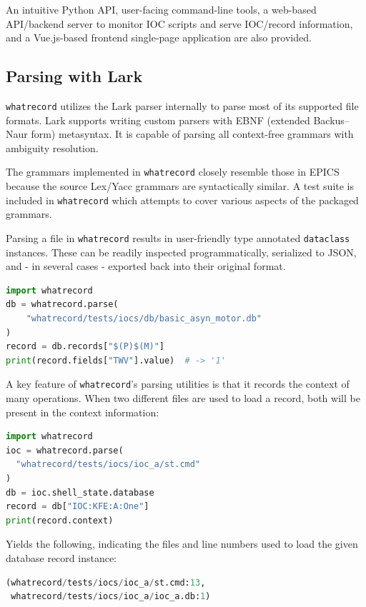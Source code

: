 \documentclass[letter,
               keeplastbox,   %
               ]{jacow}
\begin{document}
An intuitive Python API, user-facing command-line tools, a web-based
API/backend server to monitor IOC scripts and serve IOC/record information, and
a Vue.js-based frontend single-page application are also provided.

\subsection{Parsing with Lark}

\verb_whatrecord_ utilizes the Lark parser internally to parse most of its supported
file formats.  Lark supports writing custom parsers with EBNF (extended
Backus–Naur form) metasyntax.  It is capable of parsing all context-free
grammars with ambiguity resolution. 

The grammars implemented in \verb_whatrecord_ closely resemble those in EPICS because
the source Lex/Yacc grammars are syntactically similar.  A test suite is
included in \verb_whatrecord_ which attempts to cover various aspects of the packaged
grammars.

Parsing a file in \verb_whatrecord_ results in user-friendly type annotated
\verb_dataclass_ instances. These can be readily inspected programmatically,
serialized to JSON, and - in several cases - exported back into their original
format.

\begin{lstlisting}[language=python]
import whatrecord
db = whatrecord.parse(
    "whatrecord/tests/iocs/db/basic_asyn_motor.db"
)
record = db.records["$(P)$(M)"]
print(record.fields["TWV"].value)  # -> '1'
\end{lstlisting}

A key feature of \verb_whatrecord_'s parsing utilities is that it records the context
of many operations.  When two different files are used to load a record,
both will be present in the context information:

\begin{lstlisting}[language=python]
import whatrecord
ioc = whatrecord.parse(
  "whatrecord/tests/iocs/ioc_a/st.cmd"
)
db = ioc.shell_state.database
record = db["IOC:KFE:A:One"]
print(record.context)
\end{lstlisting}

Yields the following, indicating the files and line numbers used to load the
given database record instance:
\begin{lstlisting}[language=python]
(whatrecord/tests/iocs/ioc_a/st.cmd:13,
 whatrecord/tests/iocs/ioc_a/ioc_a.db:1)
\end{lstlisting}
\end{document}
